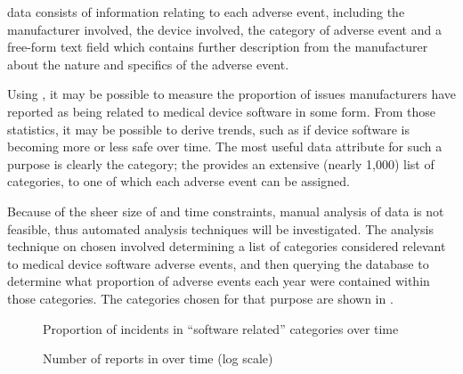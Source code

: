 \documentclass{cshonours}
\begin{document}
\maude data consists of information relating to each adverse event, including the manufacturer involved, the device involved, the category of adverse event and a free-form text field which contains further description from the manufacturer about the nature and specifics of the adverse event.

Using \maude, it may be possible to measure the proportion of issues manufacturers have reported as being related to medical device software in some form. From those statistics, it may be possible to derive trends, such as if device software is becoming more or less safe over time. The most useful data attribute for such a purpose is clearly the category; the \fda provides an extensive (nearly 1,000) list of categories, to one of which each adverse event can be assigned.

Because of the sheer size of \maude and time constraints, manual analysis of data is not feasible, thus automated analysis techniques will be investigated. The analysis technique on \maude chosen involved determining a list of categories considered relevant to medical device software adverse events, and then querying the database to determine what proportion of adverse events each year were contained within those categories. The categories chosen for that purpose are shown in .

\begin{figure}
  \centering
  
  \caption{Proportion of incidents in ``software related'' categories over time}
  \label{fig:proportiongraph}
\end{figure}

\begin{figure}
  \centering
  
  \caption{Number of reports in \maude over time (log scale)}
 \label{fig:totalgraph}
\end{figure}
\end{document}
